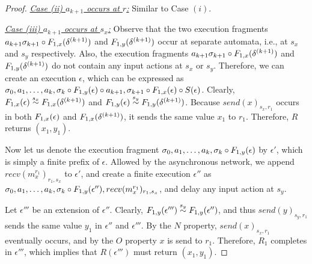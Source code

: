 \begin{proof}
   
\emph{ \underline{Case (ii) $a_{k+1}$ occurs at $r$:}} Similar to Case $(i)$.

\emph{ \underline{Case (iii) $a_{k+1}$ occurs at $s_x$:}} Observe that the two execution fragments  
   $a_{k+1} \sigma_{k+1} \circ \frag{1,x}{\delta^{(k+1)}}$ and $\frag{1,y}{\delta^{(k+1)}}$ occur at separate  automata, i.e., at $s_x$ and $s_y$ respectively. 
    Also, the  execution fragments  $a_{k+1} \sigma_{k+1} \circ \frag{1,x}{\delta^{(k+1)}}$ and $\frag{1,y}{\delta^{(k+1)}}$ do not contain any  input actions at $s_x$ or $s_y$. 
    Therefore, 
    we can create an execution $\epsilon$, which  can be expressed as 
    $\finiteprefix{k-1}{k }  \circ \frag{1,y}{\epsilon}\circ a_{k+1}, \sigma_{k+1} \circ \frag{1,x}{\epsilon} \circ \suffix{\epsilon}$. Clearly,   
     $\frag{1,x}{\epsilon} \stackrel{s_x}{\sim} \frag{1,x}{\delta^{(k+1)}}$ and  
     $\frag{1,y}{\epsilon} \stackrel{s_y}{\sim} \frag{1,y}{\delta^{(k+1)}}$.  
  Because $send(x)_{s_x, r_1}$ occurs in both $\frag{1,x}{\epsilon}$ and 
     $\frag{1,x}{\delta^{(k+1)}}$, it sends the same value $x_1$ to $r_1$. Therefore, $R$ returns $(x_1, y_1)$. 
   
   Now let us denote the execution fragment  $\finiteprefix{k-1}{k }  \circ \frag{1,y}{\epsilon}$ by $\epsilon'$, which  is simply a finite prefix of $\epsilon$.
     Allowed by the asynchronous network, we append $recv(m_x^{r_1})_{r_1, s_x}$ to $\epsilon'$, and create a finite execution $\epsilon''$ as 
        $\finiteprefix{k-1}{k }\circ \frag{1,y}{\epsilon''}, recv(m_x^{r_1})_{r_1, s_x}$, and delay any input action at $s_y$.    
        
        Let $\epsilon'''$ be an extension of $\epsilon''$. Clearly,  
             $\frag{1,y}{\epsilon'''} \stackrel{s_y}{\sim} \frag{1,y}{\epsilon''}$, and thus $send(y )_{s_y, r_1}$ sends the same value $y_1$ in $\epsilon''$ and $\epsilon'''$. 
             By the $N$ property, $send(x)_{s_x, r_1}$ eventually occurs, and by the $O$ property $x$ is send to $r_1$. Therefore, $R_1$ completes in 
$\epsilon'''$, which implies that 
             $R(\epsilon''')$ must return $(x_1, y_1)$.
             

\end{proof}
